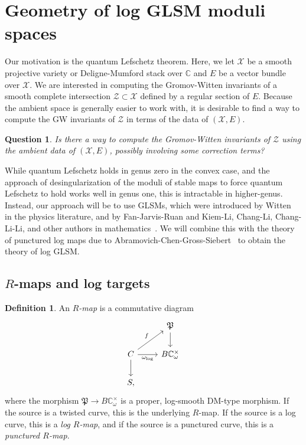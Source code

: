 \documentclass[10pt,oldfontcommands,oneside]{memoir}
\newtheorem{quest}[thm]{Question}
\theoremstyle{definition}
\newtheorem{defn}[thm]{Definition}
\theoremstyle{remark}
\theoremstyle{plain}
\theoremstyle{definition}
\theoremstyle{remark}
\newcommand{\C}{\mathbb{C}}
\newcommand{\mc}[1]{\mathcal{#1}}
\newcommand{\mf}[1]{\mathfrak{#1}}
\newcommand{\1}{\mathbf{1}}
\newcommand{\2}{\mathbf{2}}
\newcommand{\3}{\mathbf{3}}
\begin{document}
\section{Geometry of log GLSM moduli spaces}%
\label{sec:Foundationslogglsm}

Our motivation is the quantum Lefschetz theorem. Here, we let $\mc{X}$ be a smooth projective variety or Deligne-Mumford stack over $\C$ and $E$ be a vector bundle over $\mc{X}$. We are interested in computing the Gromov-Witten invariants of a smooth complete intersection $\mc{Z} \subset \mc{X}$ defined by a regular section of $E$. Because the ambient space is generally easier to work with, it is desirable to find a way to compute the GW invariants of $\mc{Z}$ in terms of the data of $(\mc{X}, E)$.

\begin{quest}
    Is there a way to compute the Gromov-Witten invariants of $\mc{Z}$ using the ambient data of $(\mc{X}, E)$, possibly involving some correction terms?
\end{quest}

While quantum Lefschetz holds in genus zero in the convex case, and the approach of desingularization of the moduli of stable maps to force quantum Lefschetz to hold works well in genus one, this is intractable in higher-genus. Instead, our approach will be to use GLSMs, which were introduced by Witten~\cite{mirrorandglsm} in the physics literature, and by Fan-Jarvis-Ruan and Kiem-Li, Chang-Li, Chang-Li-Li, and other authors in mathematics~\cite{glsm,cosection,pfieldschangli,wittencosection}. We will combine this with the theory of punctured log maps due to Abramovich-Chen-Gross-Siebert~\cite{puncturedlog} to obtain the theory of log GLSM.

\subsection{$R$-maps and log targets}%
\label{sub:R-maps}

\begin{defn}
    An \textit{$R$-map} is a commutative diagram
    \begin{equation*}
    \begin{tikzcd}
        & \mf{P} \ar{d} \\
        C \ar{d} \ar{ur}{f} \ar[swap]{r}{\omega_{\log}} & B \C^{\times}_{\omega} \\
        S,
    \end{tikzcd}
    \end{equation*}
    where the morphism $\mf{P} \to B\C_{\omega}^{\times}$ is a proper, log-smooth DM-type morphism. If the source is a twisted curve, this is the underlying $R$-map. If the source is a log curve, this is a \textit{log $R$-map}, and if the source is a punctured curve, this is a \textit{punctured $R$-map}.
\end{defn}
\end{document}

